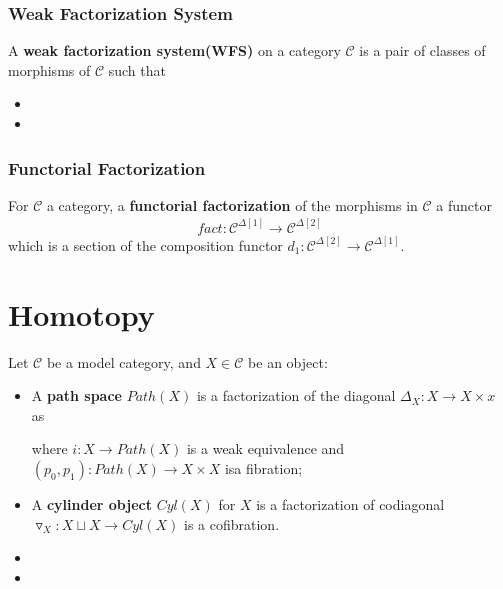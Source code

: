 \documentclass[Total.tex]{subfiles}
\begin{document}
			\subsubsection{Weak Factorization System}
			\begin{Def}
				A \textbf{weak factorization system(WFS)} on a category $\mathcal{C}$ is a pair of classes of morphisms of $\mathcal{C}$ such that
				\begin{itemize}
					\item 
					\item
				\end{itemize}
			\end{Def}
			\subsubsection{Functorial Factorization}
			\begin{Def}
				For $\mathcal{C}$ a category, a \textbf{functorial factorization} of the morphisms in $\mathcal{C}$ a functor
				\begin{gather*}
					fact:\mathcal{C}^{\Delta[1]}\rightarrow \mathcal{C}^{\Delta[2]}
				\end{gather*}
				which is a section of the composition functor $d_1:\mathcal{C}^{\Delta[2]}\rightarrow \mathcal{C}^{\Delta[1]}$. 
			\end{Def}
		\section{Homotopy}
			\begin{Def}
				Let $\mathcal{C}$ be a model category, and $X\in \mathcal{C}$ be an object:
				\begin{itemize}
					\item A \textbf{path space} $Path(X)$ is a factorization of the diagonal $\Delta_X:X\rightarrow X\times x$ as
					\begin{center}
					\end{center}
					where $i:X\rightarrow Path(X)$ is a weak equivalence and $(p_0,p_1):Path(X)\rightarrow X\times X$ isa fibration;
					\item A \textbf{cylinder object} $Cyl(X)$ for $X$ is a factorization of codiagonal $\triangledown_X:X\sqcup X\rightarrow Cyl(X)$ is a cofibration.
					\item 
					\item 
				\end{itemize}
			\end{Def}
\end{document}
